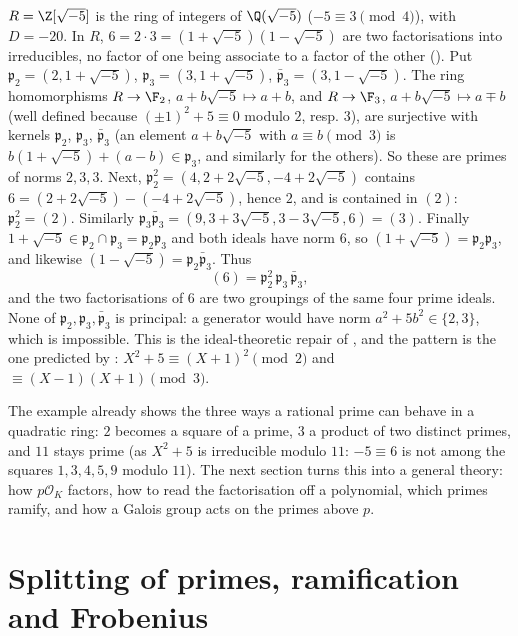 \begin{example}\label{ex:ant:sqrtminus5}
$R=\Z[\sqrt{-5}]$ is the ring of integers of $\Q(\sqrt{-5})$ ($-5\equiv3\pmod4$), with $D=-20$. In $R$, $6=2\cdot3=(1+\sqrt{-5})(1-\sqrt{-5})$
are two factorisations into irreducibles, no factor of one being associate to a factor of the other (). Put
$\mathfrak p_2=(2,1+\sqrt{-5})$, $\mathfrak p_3=(3,1+\sqrt{-5})$, $\bar{\mathfrak p}_3=(3,1-\sqrt{-5})$. The ring homomorphisms $R\to\F_2$,
$a+b\sqrt{-5}\mapsto a+b$, and $R\to\F_3$, $a+b\sqrt{-5}\mapsto a\mp b$ (well defined because $(\pm1)^2+5\equiv0$ modulo $2$, resp. $3$), are surjective
with kernels $\mathfrak p_2$, $\mathfrak p_3$, $\bar{\mathfrak p}_3$ (an element $a+b\sqrt{-5}$ with $a\equiv b\pmod 3$ is $b(1+\sqrt{-5})+(a-b)\in\mathfrak p_3$,
and similarly for the others). So these are primes of norms $2,3,3$. Next, $\mathfrak p_2^2=(4,2+2\sqrt{-5},-4+2\sqrt{-5})$ contains
$6=(2+2\sqrt{-5})-(-4+2\sqrt{-5})$, hence $2$, and is contained in $(2)$: $\mathfrak p_2^2=(2)$. Similarly $\mathfrak p_3\bar{\mathfrak p}_3=(9,3+3\sqrt{-5},
3-3\sqrt{-5},6)=(3)$. Finally $1+\sqrt{-5}\in\mathfrak p_2\cap\mathfrak p_3=\mathfrak p_2\mathfrak p_3$ and both ideals have norm $6$, so
$(1+\sqrt{-5})=\mathfrak p_2\mathfrak p_3$, and likewise $(1-\sqrt{-5})=\mathfrak p_2\bar{\mathfrak p}_3$. Thus
\[
(6)=\mathfrak p_2^2\,\mathfrak p_3\,\bar{\mathfrak p}_3,
\]
and the two factorisations of $6$ are two groupings of the same four prime ideals. None of $\mathfrak p_2,\mathfrak p_3,\bar{\mathfrak p}_3$ is principal: a
generator would have norm $a^2+5b^2\in\{2,3\}$, which is impossible. This is the ideal-theoretic repair of , and the pattern is
the one predicted by : $X^2+5\equiv(X+1)^2\pmod2$ and $\equiv(X-1)(X+1)\pmod3$.
\end{example}

The example already shows the three ways a rational prime can behave in a quadratic ring: $2$ becomes a square of a prime, $3$ a product of two distinct primes,
and $11$ stays prime (as $X^2+5$ is irreducible modulo $11$: $-5\equiv6$ is not among the squares $1,3,4,5,9$ modulo $11$). The next section turns this into a general theory:
how $p\mathcal O_K$ factors, how to read the factorisation off a polynomial, which primes ramify, and how a Galois group acts on the primes above $p$.

\section{Splitting of primes, ramification and Frobenius}\label{sec:ant:splitting}

